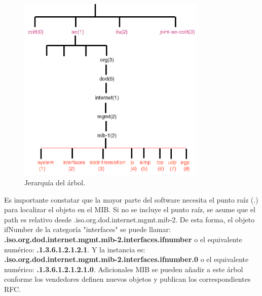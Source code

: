 \begin{figure}[htbp!]
	\centering
		\includegraphics[width=0.8\textwidth]{images/introduccion/jerarquia}
	\caption{Jerarquía del árbol.}
\end{figure}

\noindent
Es importante constatar que la mayor parte del software necesita el punto raíz (.) para localizar el objeto en el MIB. Si no se incluye el punto raíz, se asume que el path es relativo desde .iso.org.dod.internet.mgmt.mib-2.
\noindent
De esta forma, el objeto ifNumber de la categoría "interfaces" se puede llamar: \textbf{.iso.org.dod.internet.mgmt.mib-2.interfaces.ifnumber} o el equivalente numérico: \textbf{.1.3.6.1.2.1.2.1}. Y la instancia es: \textbf{.iso.org.dod.internet.mgmt.mib-2.interfaces.ifnumber.0}
o el equivalente numérico: \textbf{.1.3.6.1.2.1.2.1.0}.
\noindent
Adicionales MIB se pueden añadir a este árbol conforme los vendedores definen nuevos objetos y publican los correspondientes RFC.